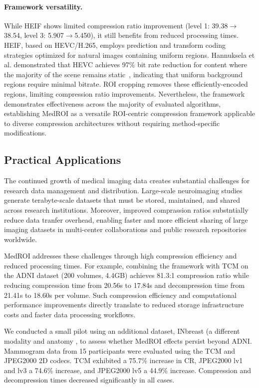 \documentclass[runningheads]{llncs}
\begin{document}
\paragraph{Framework versatility.}
While HEIF shows limited compression ratio improvement (level 1: 39.38$\rightarrow$38.54, level 3: 5.907$\rightarrow$5.450), it still benefits from reduced processing times. HEIF, based on HEVC/H.265, employs prediction and transform coding strategies optimized for natural images containing uniform regions. Hannuksela et al. demonstrated that HEVC achieves 97\% bit rate reduction for content where the majority of the scene remains static~\cite{Hannuksela2015}, indicating that uniform background regions require minimal bitrate. ROI cropping removes these efficiently-encoded regions, limiting compression ratio improvements. Nevertheless, the framework demonstrates effectiveness across the majority of evaluated algorithms, establishing MedROI as a versatile ROI-centric compression framework applicable to diverse compression architectures without requiring method-specific modifications.

\vspace{-0.2cm}

\subsection{Practical Applications}
The continued growth of medical imaging data creates substantial challenges for research data management and distribution. Large-scale neuroimaging studies generate terabyte-scale datasets that must be stored, maintained, and shared across research institutions. Moreover, improved comprassion ratios substntially reduce data tranfer overhead, enabling faster and more efficient sharing of large imaging datasets in multi-center collaborations and public research repositories worldwide. 

MedROI addresses these challenges through high compression efficiency and reduced processing times. For example, combining the framework with TCM on the ADNI dataset (200 volumes, 4.4GB) achieves 81.3:1 compression ratio while reducing compression time from 20.56s to 17.84s and decompression time from 21.41s to 18.60s per volume. Such compression efficiency and computational performance improvements directly translate to reduced storage infrastructure costs and faster data processing workflows.

We conducted a small pilot using an additional dataset, INbreast (a different modality and anatomy 
\cite{mammo}, to assess whether MedROI effects persist beyond ADNI. Mammogram data from 15 participants were evaluated using the TCM and JPEG2000 2D codecs. TCM exhibited a 75.7\% increase in CR, JPEG2000 lv1 and lv3 a 74.6\% increase, and JPEG2000 lv5 a 44.9\% increase. Compression and decompression times decreased significantly in all cases.
\end{document}
